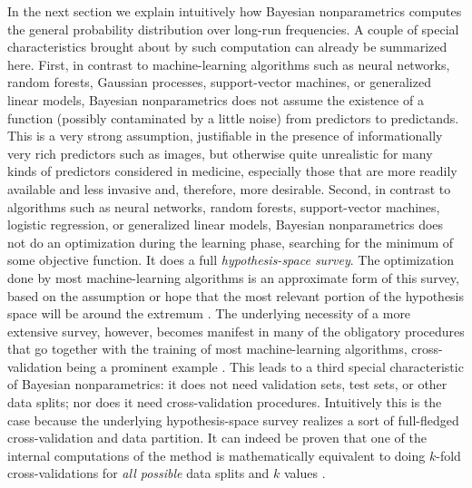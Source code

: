 \documentclass[a4paper,12pt,%
onecolumn,oneside,article,%
british%
]{memoir}
\theoremstyle{remark}
\theoremstyle{innote}
\newcommand*{\pencil}{{\fontencoding{U}\fontfamily{fontawesometwo}\selectfont\symbol{210}}}
\newcommand{\mynotep}[1]{{\footnotesize\color{notecolour}\pencil\ #1}}
\renewcommand*{\|}[1][]{\nonscript\:#1\vert\nonscript\:\mathopen{}}
\newcommand*{\sect}{\S}%
\newcommand*{\sects}{\S\S}%
\newcommand*{\chap}{ch.}%
\begin{document}


In the next section we explain intuitively how Bayesian nonparametrics computes the general probability distribution over long-run frequencies. A couple of special characteristics brought about by such computation can already be summarized here. First, in contrast to machine-learning algorithms such as neural networks, random forests, Gaussian processes, support-vector machines, or generalized linear models, Bayesian nonparametrics does not assume the existence of a function (possibly contaminated by a little noise) from predictors to predictands. This is a very strong assumption,  justifiable in the presence of informationally very rich predictors such as images, but otherwise quite unrealistic for many kinds of predictors considered in medicine, especially those that are more readily available and less invasive and, therefore, more desirable. Second, in contrast to algorithms such as neural networks, random forests, support-vector machines, logistic regression, or generalized linear models, Bayesian nonparametrics does not do an optimization during the learning phase, searching for the minimum of some objective function. It does a full \emph{hypothesis-space survey}. %
The optimization done by most machine-learning algorithms is an approximate form of this survey, based on the assumption or hope that the most relevant portion of the hypothesis space will be around the extremum \autocites[\chap~16]{mackay1992,murphy2012}[see also][]{selfetal1987}. The underlying necessity of a more extensive survey, however, becomes manifest in many of the obligatory procedures that go together with the training of most machine-learning algorithms, cross-validation being a prominent example \autocites{mackay1992b}. This leads to a third special characteristic of Bayesian nonparametrics: it does not need validation sets, test sets, or other data splits; nor does it need cross-validation procedures. Intuitively this is the case because the underlying hypothesis-space survey realizes a sort of full-fledged cross-validation and data partition. It can indeed be proven that one of the internal computations of the method is mathematically equivalent to doing $k$-fold cross-validations for \emph{all possible} data splits and $k$ values \autocites{portamana2019b,fongetal2020}.
\end{document}
